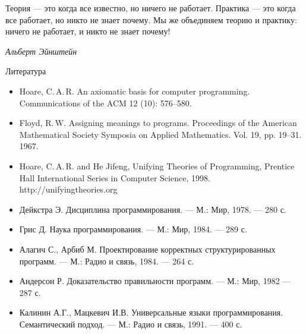 \documentclass[landscape]{slides}
\begin{document}
\begin{slide}
        \begin{Large}
Теория — это когда все известно, но ничего не работает. Практика — это когда все работает, но никто не знает почему. Мы же объединяем теорию и практику: ничего не работает, и никто не знает почему!
        \end{Large}

\begin{flushright}
\emph{Альберт Эйнштейн}
\end{flushright}
\end{slide}

\begin{slide}
        Литература
        \begin{itemize}
\item Hoare, C.\,A.\,R. An axiomatic basis for computer programming.\\Communications of the ACM 12 (10): 576–580.
\item Floyd, R.\,W. Assigning meanings to programs. Proceedings of the American Mathematical Society Symposia on Applied Mathematics. Vol. 19, pp. 19–31. 1967.
\item Hoare, C.\,A.\,R. and He Jifeng, Unifying Theories of Programming, Prentice Hall International Series in Computer Science, 1998.\\http://unifyingtheories.org
        \end{itemize}
\end{slide}

\begin{slide}
        \begin{itemize}
\item Дейкстра Э. Дисциплина программирования. — М.: Мир, 1978. — 280 с.
\item Грис Д. Наука программирования. — М.: Мир, 1984. — 289 с.
\item Алагич С., Арбиб М. Проектирование корректных структурированных программ. — М.: Радио и связь, 1984. — 264 с.
\item Андерсон Р. Доказательство правильности программ. — М.: Мир, 1982 — 287 с.
\item Калинин А.Г., Мацкевич И.В. Универсальные языки программирования. Семантический подход. — М.: Радио и связь, 1991. — 400 с.
        \end{itemize}
\end{slide}
\end{document}
